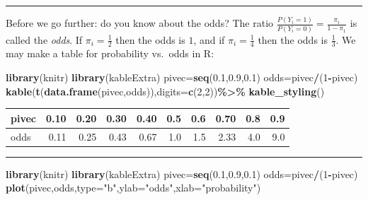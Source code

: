 \documentclass[
]{article}
\newenvironment{Shaded}{\begin{snugshade}}{\end{snugshade}}
\newcommand{\AttributeTok}[1]{\textcolor[rgb]{0.13,0.29,0.53}{#1}}
\newcommand{\DecValTok}[1]{\textcolor[rgb]{0.00,0.00,0.81}{#1}}
\newcommand{\FloatTok}[1]{\textcolor[rgb]{0.00,0.00,0.81}{#1}}
\newcommand{\FunctionTok}[1]{\textcolor[rgb]{0.13,0.29,0.53}{\textbf{#1}}}
\newcommand{\NormalTok}[1]{#1}
\newcommand{\OtherTok}[1]{\textcolor[rgb]{0.56,0.35,0.01}{#1}}
\newcommand{\SpecialCharTok}[1]{\textcolor[rgb]{0.81,0.36,0.00}{\textbf{#1}}}
\newcommand{\StringTok}[1]{\textcolor[rgb]{0.31,0.60,0.02}{#1}}
\begin{document}
\begin{center}\rule{0.5\linewidth}{0.5pt}\end{center}

Before we go further: do you know about the odds? The ratio
\(\frac{P(Y_i=1)}{P(Y_i=0)}=\frac{\pi_i}{1-\pi_1}\) is called the
\emph{odds}. If \(\pi_i=\frac{1}{2}\) then the odds is \(1\), and if
\(\pi_i=\frac{1}{4}\) then the odds is \(\frac{1}{3}\). We may make a
table for probability vs.~odds in R:

\begin{Shaded}
\begin{Highlighting}[]
\FunctionTok{library}\NormalTok{(knitr)}
\FunctionTok{library}\NormalTok{(kableExtra)}
\NormalTok{pivec}\OtherTok{=}\FunctionTok{seq}\NormalTok{(}\FloatTok{0.1}\NormalTok{,}\FloatTok{0.9}\NormalTok{,}\FloatTok{0.1}\NormalTok{)}
\NormalTok{odds}\OtherTok{=}\NormalTok{pivec}\SpecialCharTok{/}\NormalTok{(}\DecValTok{1}\SpecialCharTok{{-}}\NormalTok{pivec)}
\FunctionTok{kable}\NormalTok{(}\FunctionTok{t}\NormalTok{(}\FunctionTok{data.frame}\NormalTok{(pivec,odds)),}\AttributeTok{digits=}\FunctionTok{c}\NormalTok{(}\DecValTok{2}\NormalTok{,}\DecValTok{2}\NormalTok{))}\SpecialCharTok{\%\textgreater{}\%}
  \FunctionTok{kable\_styling}\NormalTok{()}
\end{Highlighting}
\end{Shaded}

\begin{table}
\centering
\begin{tabular}{l|r|r|r|r|r|r|r|r|r}
\hline
pivec & 0.10 & 0.20 & 0.30 & 0.40 & 0.5 & 0.6 & 0.70 & 0.8 & 0.9\\
\hline
odds & 0.11 & 0.25 & 0.43 & 0.67 & 1.0 & 1.5 & 2.33 & 4.0 & 9.0\\
\hline
\end{tabular}
\end{table}

\begin{center}\rule{0.5\linewidth}{0.5pt}\end{center}

\begin{Shaded}
\begin{Highlighting}[]
\FunctionTok{library}\NormalTok{(knitr)}
\FunctionTok{library}\NormalTok{(kableExtra)}
\NormalTok{pivec}\OtherTok{=}\FunctionTok{seq}\NormalTok{(}\FloatTok{0.1}\NormalTok{,}\FloatTok{0.9}\NormalTok{,}\FloatTok{0.1}\NormalTok{)}
\NormalTok{odds}\OtherTok{=}\NormalTok{pivec}\SpecialCharTok{/}\NormalTok{(}\DecValTok{1}\SpecialCharTok{{-}}\NormalTok{pivec)}
\FunctionTok{plot}\NormalTok{(pivec,odds,}\AttributeTok{type=}\StringTok{"b"}\NormalTok{,}\AttributeTok{ylab=}\StringTok{"odds"}\NormalTok{,}\AttributeTok{xlab=}\StringTok{"probability"}\NormalTok{)}
\end{Highlighting}
\end{Shaded}
\end{document}
